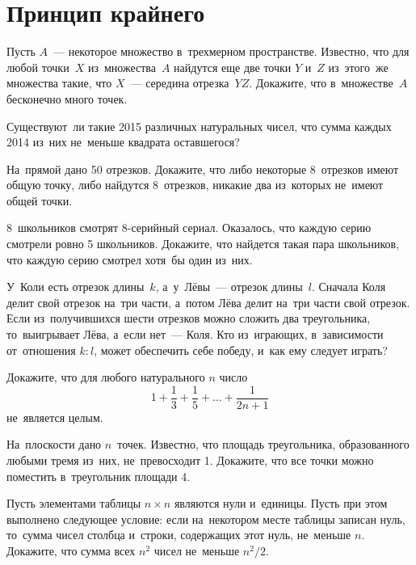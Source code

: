 
\section*{Принцип крайнего}


\begin{problems}

\item
Пусть $A$~— некоторое множество в~трехмерном пространстве.
Известно, что для любой точки~$X$ из~множества~$A$ найдутся еще две точки
$Y$ и~$Z$ из~этого~же множества такие, что $X$~— середина отрезка~$YZ$.
Докажите, что в~множестве~$A$ бесконечно много точек.

\item
Существуют~ли такие 2015 различных натуральных чисел, что сумма каждых 2014
из~них не~меньше квадрата оставшегося?

\item
На~прямой дано 50 отрезков.
Докажите, что либо некоторые 8~отрезков имеют общую точку, либо найдутся
8~отрезков, никакие два из~которых не~имеют общей точки.

\item
8~школьников смотрят 8-серийный сериал.
Оказалось, что каждую серию смотрели ровно 5 школьников.
Докажите, что найдется такая пара школьников, что каждую серию смотрел хотя~бы
один из~них.

\item
У~Коли есть отрезок длины~$k$, а~у~Лёвы~— отрезок длины~$l$.
Сначала Коля делит свой отрезок на~три части, а~потом Лёва делит на~три части
свой отрезок.
Если из~получившихся шести отрезков можно сложить два треугольника,
то~выигрывает Лёва, а~если нет~— Коля.
Кто из~играющих, в~зависимости от~отношения $k : l$, может обеспечить себе
победу, и~как ему следует играть?

\item
Докажите, что для любого натурального $n$ число
\[
    1 + \frac{1}{3} + \frac{1}{5} + \ldots + \frac{1}{2 n + 1}
\]
не~является целым.

\item
На~плоскости дано $n$~точек.
Известно, что площадь треугольника, образованного любыми тремя из~них,
не~превосходит 1.
Докажите, что все точки можно поместить в~треугольник площади 4.

\item
Пусть элементами таблицы $n \times n$ являются нули и~единицы.
Пусть при этом выполнено следующее условие: если на~некотором месте таблицы
записан нуль, то~сумма чисел столбца и~строки, содержащих этот нуль,
не~меньше $n$.
Докажите, что сумма всех $n^2$ чисел не~меньше $n^2 / 2$.

\end{problems}

